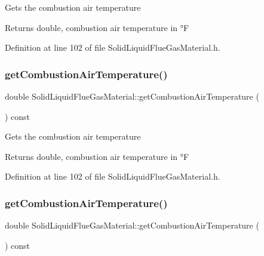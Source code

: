 Gets the combustion air temperature \begin{DoxyReturn}{Returns}
double, combustion air temperature in °F 
\end{DoxyReturn}


Definition at line 102 of file Solid\+Liquid\+Flue\+Gas\+Material.\+h.

\mbox{\label{class_solid_liquid_flue_gas_material_a8757b831e5a2ef26dbb0cf271c0e8207}} 
\subsubsection{\texorpdfstring{get\+Combustion\+Air\+Temperature()}{getCombustionAirTemperature()}\hspace{0.1cm}{\footnotesize\ttfamily [2/3]}}
{\footnotesize\ttfamily double Solid\+Liquid\+Flue\+Gas\+Material\+::get\+Combustion\+Air\+Temperature (\begin{DoxyParamCaption}{ }\end{DoxyParamCaption}) const\hspace{0.3cm}{\ttfamily [inline]}}

Gets the combustion air temperature \begin{DoxyReturn}{Returns}
double, combustion air temperature in °F 
\end{DoxyReturn}


Definition at line 102 of file Solid\+Liquid\+Flue\+Gas\+Material.\+h.

\mbox{\label{class_solid_liquid_flue_gas_material_a8757b831e5a2ef26dbb0cf271c0e8207}} 
\subsubsection{\texorpdfstring{get\+Combustion\+Air\+Temperature()}{getCombustionAirTemperature()}\hspace{0.1cm}{\footnotesize\ttfamily [3/3]}}
{\footnotesize\ttfamily double Solid\+Liquid\+Flue\+Gas\+Material\+::get\+Combustion\+Air\+Temperature (\begin{DoxyParamCaption}{ }\end{DoxyParamCaption}) const\hspace{0.3cm}{\ttfamily [inline]}}

